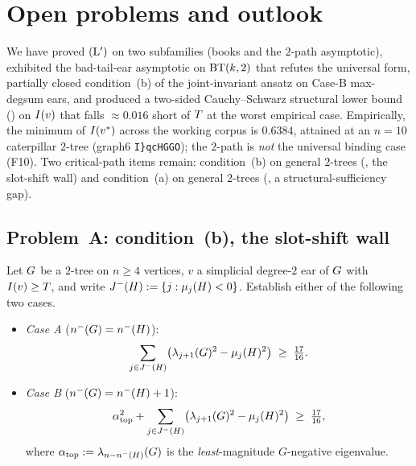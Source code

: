 \section{Open problems and outlook}\label{sec:open-problems}

We have proved $(\mathrm{L}')$ on two subfamilies (books and the $2$-path
asymptotic), exhibited the bad-tail-ear asymptotic on $\mathrm{BT}(k,2)$
that refutes the universal form, partially closed condition~(b) of
the joint-invariant
ansatz on Case-B max-degsum ears, and produced a two-sided
Cauchy--Schwarz structural lower bound () on
$I(v)$ that falls $\approx 0.016$ short of $T$ at the worst
empirical case. Empirically, the minimum of $I(v^{*})$ across the working
corpus is $0.6384$, attained at an $n = 10$ caterpillar $2$-tree
(graph6 \texttt{I\}qcHG\textasciigrave GO}); the $2$-path is
\emph{not} the universal binding case (F10). Two critical-path items
remain: condition~(b) on general $2$-trees (, the
slot-shift wall) and condition~(a) on general $2$-trees
(, a structural-sufficiency gap).

\subsection{Problem~A: condition~(b), the slot-shift wall}\label{sec:open:slot-shift}

\begin{problem}\label{prob:slot-shift}
Let $G$ be a $2$-tree on $n \ge 4$ vertices, $v$ a simplicial
degree-$2$ ear of $G$ with $I(v) \ge T$, and write
$J^{-}(H) := \{j : \mu_{j}(H) < 0\}$. Establish either
of the following two cases.
\begin{itemize}
\item \emph{Case A} ($n^{-}(G) = n^{-}(H)$):
\[
\sum_{j \in J^{-}(H)}
\bigl(\lambda_{j+1}(G)^{2} - \mu_{j}(H)^{2}\bigr)
\;\ge\; \tfrac{17}{16}.
\]
\item \emph{Case B} ($n^{-}(G) = n^{-}(H) + 1$):
\[
\alpha_{\text{top}}^{2} +
\sum_{j \in J^{-}(H)}
\bigl(\lambda_{j+1}(G)^{2} - \mu_{j}(H)^{2}\bigr)
\;\ge\; \tfrac{17}{16},
\]
where $\alpha_{\text{top}} := \lambda_{n - n^{-}(H)}(G)$ is
the \emph{least}-magnitude $G$-negative eigenvalue.
\end{itemize}
\end{problem}

